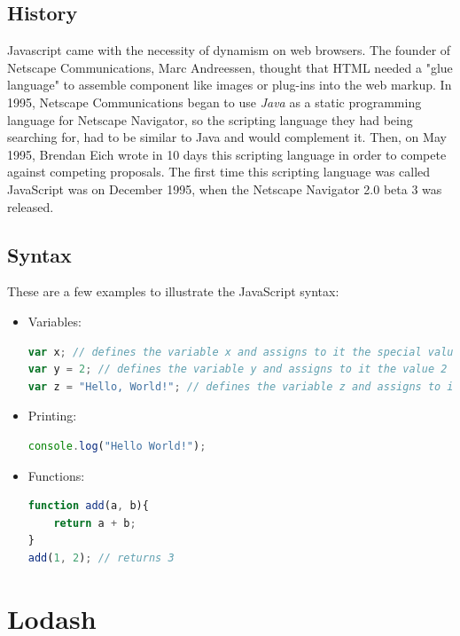 \documentclass[a4paper, 12pt, english]{book}
\begin{document}
\subsection{History}
\label{sec:javascript-history}

Javascript came with the necessity of dynamism on web browsers. The founder of Netscape Communications, Marc Andreessen, thought that HTML needed a "glue language" to assemble component like images or plug-ins into the web markup. In 1995, Netscape Communications began to use \textit{Java} as a static programming language for Netscape Navigator, so the scripting language they had being searching for, had to be similar to Java and would complement it. Then, on May 1995, Brendan Eich wrote in 10 days this scripting language in order to compete against competing proposals. The first time this scripting language was called JavaScript was on December 1995, when the Netscape Navigator 2.0 beta 3 was released.

\subsection{Syntax}
\label{sec:javascript-syntax}

These are a few examples to illustrate the JavaScript syntax:

\begin{itemize}
    \item Variables:
        \begin{lstlisting}[language=javascript]
var x; // defines the variable x and assigns to it the special value "undefined" (not to be confused with an undefined value)
var y = 2; // defines the variable y and assigns to it the value 2
var z = "Hello, World!"; // defines the variable z and assigns to it a string entitled "Hello, World!"
        \end{lstlisting}
    \item Printing:
        \begin{lstlisting}[language=javascript]
console.log("Hello World!");
        \end{lstlisting}
    \item Functions:
        \begin{lstlisting}[language=javascript]
function add(a, b){
    return a + b;
}
add(1, 2); // returns 3
        \end{lstlisting}
\end{itemize}


\section{Lodash}
\label{sec:flexbox}
\end{document}
